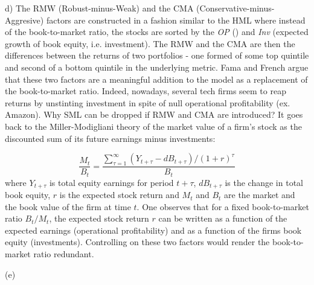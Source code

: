 \documentclass[10pt]{article}
\newenvironment{exercise}[2][Exercise]{\begin{trivlist}
  \item[\hskip \labelsep {\bfseries #1}\hskip \labelsep {\bfseries #2.}]}{\end{trivlist}}
\begin{document}
\begin{exercise}{3}
  (d) The RMW (Robust-minus-Weak) and the CMA (Conservative-minus-Aggresive)
  factors are constructed in a fashion similar to the HML where instead of the
  book-to-market ratio, the stocks are sorted by the \textit{OP} () and \textit{Inv} (expected growth of book equity, i.e.
  investment). The RMW and the CMA are then the differences between the returns
  of two portfolios - one formed of some top quintile and second of a bottom
  quintile in the underlying metric. Fama and French argue that these two
  factors are a meaningful addition to the model as a replacement of the
  book-to-market ratio. Indeed, nowadays, several tech firms seem to reap
  returns by unstinting investment in spite of null operational profitability
  (ex. Amazon). Why SML can be dropped if RMW and CMA are introduced? It goes
  back to the Miller-Modigliani theory of the market value of a firm's stock as
  the discounted sum of its future earnings minus investments:

  \begin{equation}
    \frac{M_t}{B_t} = \frac{\sum_{\tau = 1}^\infty(Y_{t + \tau} - d B_{t + \tau})/(1 + r)^\tau}{B_t}
  \end{equation}
where $Y_{t + \tau}$ is total equity earnings for period $t + \tau$, $dB_{t
  + \tau}$ is the change in total book equity, $r$ is the expected stock return
and $M_t$ and $B_t$ are the market and the book value of the firm at time $t$.
One observes that for a fixed book-to-market ratio $B_t / M_t$, the expected
stock return $r$ can be written as a function of the expected earnings
(operational profitability) and as
a function of the firms book equity (investments). Controlling on these two
factors would render the book-to-market ratio redundant. 

(e)


\end{exercise}
\end{document}
